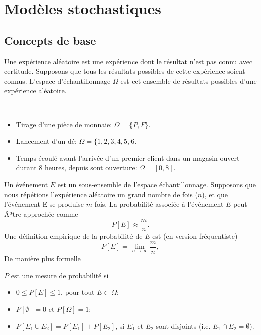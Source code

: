\chapter{Modèles stochastiques}

\section{Concepts de base}

Une expérience aléatoire est une expérience dont le résultat n'est pas connu avec certitude.
Supposons que tous les résultats possibles de cette expérience soient connus.
L'espace d'échantillonnage $\Omega$ est cet ensemble de résultats possibles d'une expérience aléatoire.

\begin{example}
\mbox{}\\
 \begin{itemize}
  \item 
   Tirage d'une pièce de monnaie: $\Omega = \lbrace P,F \rbrace$.
  \item
  Lancement d'un dé: $\Omega  = \lbrace 1,2,3,4,5,6 $.
 \item
  Temps écoulé avant l'arrivée d'un premier client dans un magasin ouvert durant 8 heures, depuis sont ouverture: $\Omega =[0,8]$.
 \end{itemize}
\end{example}

Un événement $E$ est un sous-ensemble de l'espace échantillonnage.
Supposons que nous répétions l'expérience aléatoire un grand nombre de fois ($n$),
et que l'événement E se produise $m$ fois.
La probabilité associée à l'événement $E$ peut Ãªtre approchée comme
\[
 P[E] \approx \frac{m}{n}. 
\]
Une définition empirique de la probabilité de $E$ est (en version fréquentiste)
\[
 P[E] = \lim_{n \rightarrow \infty} \frac{m}{n}, 
\]
De manière plus formelle
\begin{definition}
$P$ est une mesure de probabilité si
\begin{itemize}
 \item 
  $0 \leq P[E] \leq 1$, pour tout $E \subset \Omega$;
 \item
  $P[ \emptyset ] = 0$ et $P[ \Omega] = 1$;
 \item
  $P[E_1 \cup E_2] = P[E_1] + P[E_2]$, si $E_1$ et $E_2$ sont disjoints (i.e. $E_1 \cap E_2 = \emptyset$).
\end{itemize}
\end{definition}

